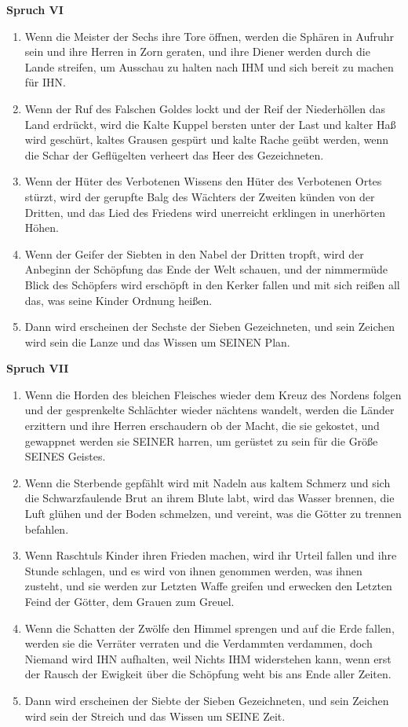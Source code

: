 \textbf{Spruch VI}

\begin{enumerate}
    \item Wenn die Meister der Sechs ihre Tore öffnen, werden die Sphären in Aufruhr sein und ihre Herren in Zorn geraten, und ihre Diener werden durch die Lande streifen, um Ausschau zu halten nach IHM und sich bereit zu machen für IHN.
    \item Wenn der Ruf des Falschen Goldes lockt und der Reif der Niederhöllen das Land erdrückt, wird die Kalte Kuppel bersten unter der Last und kalter Haß wird geschürt, kaltes Grausen gespürt und kalte Rache geübt werden, wenn die Schar der Geflügelten verheert das Heer des Gezeichneten.
    \item Wenn der Hüter des Verbotenen Wissens den Hüter des Verbotenen Ortes stürzt, wird der gerupfte Balg des Wächters der Zweiten künden von der Dritten, und das Lied des Friedens wird unerreicht erklingen in unerhörten Höhen.
    \item Wenn der Geifer der Siebten in den Nabel der Dritten tropft, wird der Anbeginn der Schöpfung das Ende der Welt schauen, und der nimmermüde Blick des Schöpfers wird erschöpft in den Kerker fallen und mit sich reißen all das, was seine Kinder Ordnung heißen.
    \item Dann wird erscheinen der Sechste der Sieben Gezeichneten, und sein Zeichen wird sein die Lanze und das Wissen um SEINEN Plan.
\end{enumerate}

\textbf{Spruch VII}

\begin{enumerate}
    \item Wenn die Horden des bleichen Fleisches wieder dem Kreuz des Nordens folgen und der gesprenkelte Schlächter wieder nächtens wandelt, werden die Länder erzittern und ihre Herren erschaudern ob der Macht, die sie gekostet, und gewappnet werden sie SEINER harren, um gerüstet zu sein für die Größe SEINES Geistes.
    \item Wenn die Sterbende gepfählt wird mit Nadeln aus kaltem Schmerz und sich die Schwarzfaulende Brut an ihrem Blute labt, wird das Wasser brennen, die Luft glühen und der Boden schmelzen, und vereint, was die Götter zu trennen befahlen.
    \item Wenn Raschtuls Kinder ihren Frieden machen, wird ihr Urteil fallen und ihre Stunde schlagen, und es wird von ihnen genommen werden, was ihnen zusteht, und sie werden zur Letzten Waffe greifen und erwecken den Letzten Feind der Götter, dem Grauen zum Greuel.
    \item Wenn die Schatten der Zwölfe den Himmel sprengen und auf die Erde fallen, werden sie die Verräter verraten und die Verdammten verdammen, doch Niemand wird IHN aufhalten, weil Nichts IHM widerstehen kann, wenn erst der Rausch der Ewigkeit über die Schöpfung weht bis ans Ende aller Zeiten.
    \item Dann wird erscheinen der Siebte der Sieben Gezeichneten, und sein Zeichen wird sein der Streich und das Wissen um SEINE Zeit.
\end{enumerate}

